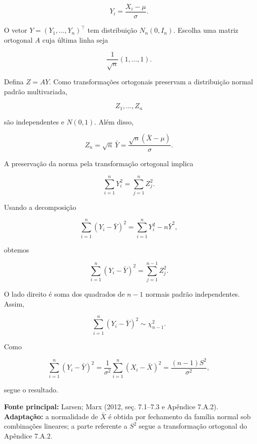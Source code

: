 \documentclass[
  letterpaper,
  DIV=11,
  numbers=noendperiod]{scrreprt}
\begin{document}
\[
Y_i=\frac{X_i-\mu}{\sigma}.
\]

O vetor \(Y=(Y_1,\ldots,Y_n)^\top\) tem distribuição \(N_n(0,I_n)\).
Escolha uma matriz ortogonal \(A\) cuja última linha seja

\[
\frac{1}{\sqrt n}(1,\ldots,1).
\]

Defina \(Z=AY\). Como transformações ortogonais preservam a distribuição
normal padrão multivariada,

\[
Z_1,\ldots,Z_n
\]

são independentes e \(N(0,1)\). Além disso,

\[
Z_n=\sqrt n\,\bar Y
=
\frac{\sqrt n(\bar X-\mu)}{\sigma}.
\]

A preservação da norma pela transformação ortogonal implica

\[
\sum_{i=1}^nY_i^2
=
\sum_{j=1}^nZ_j^2.
\]

Usando a decomposição

\[
\sum_{i=1}^n(Y_i-\bar Y)^2
=
\sum_{i=1}^nY_i^2-n\bar Y^2,
\]

obtemos

\[
\sum_{i=1}^n(Y_i-\bar Y)^2
=
\sum_{j=1}^{n-1}Z_j^2.
\]

O lado direito é soma dos quadrados de \(n-1\) normais padrão
independentes. Assim,

\[
\sum_{i=1}^n(Y_i-\bar Y)^2\sim\chi^2_{n-1}.
\]

Como

\[
\sum_{i=1}^n(Y_i-\bar Y)^2
=
\frac{1}{\sigma^2}\sum_{i=1}^n(X_i-\bar X)^2
=
\frac{(n-1)S^2}{\sigma^2},
\]

segue o resultado.

\begin{tcolorbox}[enhanced jigsaw, colback=white, leftrule=.75mm, colbacktitle=quarto-callout-note-color!10!white, breakable, titlerule=0mm, bottomtitle=1mm, title=\textcolor{quarto-callout-note-color}{\faInfo}\hspace{0.5em}{Fonte da demonstração}, colframe=quarto-callout-note-color-frame, toprule=.15mm, opacityback=0, bottomrule=.15mm, opacitybacktitle=0.6, arc=.35mm, toptitle=1mm, rightrule=.15mm, coltitle=black, left=2mm]

\textbf{Fonte principal:} Larsen; Marx (2012, seç. 7.1--7.3 e Apêndice
7.A.2).\\
\textbf{Adaptação:} a normalidade de \(\bar X\) é obtida por fechamento
da família normal sob combinações lineares; a parte referente a \(S^2\)
segue a transformação ortogonal do Apêndice 7.A.2.

\end{tcolorbox}
\end{document}
